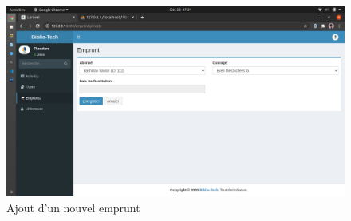 \begin{figure}[h]
    \centering
    \includegraphics[width=1\textwidth]{ajout_emprunt}
    \caption{Ajout d'un nouvel emprunt}
    \label{image-ajout_emprunt}
\end{figure}
